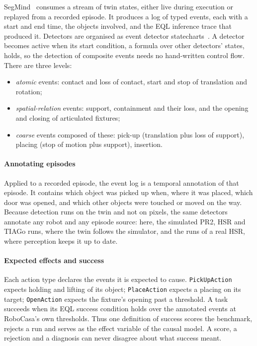 \documentclass[letterpaper, 10 pt, conference]{ieeeconf}
\newcommand{\robocasa}{RoboCasa}
\newcommand{\segmind}{SegMind}
\newcommand{\eql}{EQL}
\begin{document}
\segmind{}~\cite{arion2026segmind} consumes a stream of twin states, either live
during execution or replayed from a recorded episode. It produces a log of typed
events, each with a start and end time, the objects involved, and the \eql{}
inference trace that produced it. Detectors are organised as event detector
statecharts~\cite{stelter2025motionstatecharts}. A detector becomes active when
its start condition, a formula over other detectors' states, holds, so the
detection of composite events needs no hand-written control flow. There are
three levels:
\begin{itemize}
  \item \emph{atomic} events: contact and loss of contact, start and stop of
        translation and rotation;
  \item \emph{spatial-relation} events: support, containment and their loss,
        and the opening and closing of articulated fixtures;
  \item \emph{coarse} events composed of these: pick-up (translation plus loss
        of support), placing (stop of motion plus support), insertion.
\end{itemize}

\paragraph*{Annotating episodes}
Applied to a recorded episode, the event log is a temporal annotation of that
episode. It contains which object was picked up when, where it was placed, which
door was opened, and which other objects were touched or moved on the way.
Because detection runs on the twin and not on pixels, the same detectors
annotate any robot and any episode source: here, the simulated PR2, HSR and
TIAGo runs, where the twin follows the simulator, and the runs of a real HSR,
where perception keeps it up to date.

\paragraph*{Expected effects and success}
Each action type declares the events it is expected to cause.
\texttt{PickUpAction} expects holding and lifting of its object;
\texttt{PlaceAction} expects a placing on its target; \texttt{OpenAction}
expects the fixture's opening past a threshold. A task succeeds when its \eql{}
success condition holds over the annotated events at \robocasa{}'s own
thresholds. Thus one definition of success scores the benchmark, rejects a run
and serves as the effect variable of the causal model. A score, a rejection and
a diagnosis can never disagree about what success meant.
\end{document}
